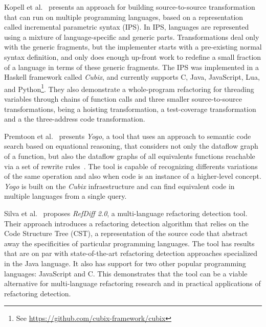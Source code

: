 Kopell et al.~\cite{kopell2018-language-parametric-transformation} presents an
approach for building source-to-source transformation that can run on multiple
programming languages, based on a representation called incremental parametric
syntax (IPS).
In IPS, languages are represented using a mixture of language-specific and
generic parts. Transformations deal only with the generic fragments, but
the implementer starts with a pre-existing normal syntax definition, and
only does enough up-front work to redefine a small fraction of a language
in terms of these generic fragments.
The IPS was implemented in a Haskell framework called \textit{Cubix},
and currently supports C, Java, JavaScript, Lua, and Python\footnote{
See \url{https://github.com/cubix-framework/cubix}}.
They also demonstrate a whole-program refactoring for threading variables
through chains of function calls and three smaller source-to-source
transformations, being a hoisting transformation, a test-coverage
transformation and a the three-address code transformation.

Premtoon et al.~\cite{premtoon2020-code-search-equational-reasoning} presents
\textit{Yogo}, a tool that uses an approach to semantic code search
based on equational reasoning, that considers not only the dataflow graph of
a function, but also the dataflow graphs of all equivalents functions reachable
via a set of rewrite rules~\cite{premtoon2020-code-search-equational-reasoning}.
The tool is capable of recognizing differents variations of the same operation
and also when code is an instance of a higher-level concept.
\textit{Yogo} is built on the \textit{Cubix} infraestructure and can find
equivalent code in multiple languages from a single query.

Silva et al.~\cite{silva2021-refdiff} proposes \textit{RefDiff 2.0}, a
multi-language refactoring detection tool. Their approach introduces a
refactoring detection algorithm that relies on the Code Structure Tree
(CST), a representation of the source code that abstract away the
specificities of particular programming languages.
The tool has results that are on par with state-of-the-art refactoring
detection approaches specialized in the Java language. It also has support
for two other popular programming languages: JavaScript and C. This
demonstrates that the tool can be a viable alternative for multi-language
refactoring research and in practical applications of refactoring detection.

